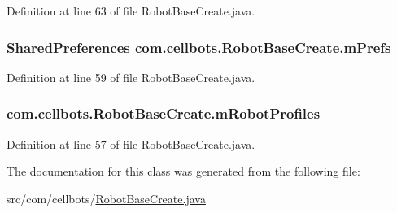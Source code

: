 Definition at line 63 of file Robot\-Base\-Create.\-java.

\hypertarget{classcom_1_1cellbots_1_1_robot_base_create_a67e665a1fb6390ef9611ef49c37d565a}{
\subsubsection[{m\-Prefs}]{\setlength{\rightskip}{0pt plus 5cm}Shared\-Preferences {\bf com.\-cellbots.\-Robot\-Base\-Create.\-m\-Prefs}}}\label{classcom_1_1cellbots_1_1_robot_base_create_a67e665a1fb6390ef9611ef49c37d565a}


Definition at line 59 of file Robot\-Base\-Create.\-java.

\hypertarget{classcom_1_1cellbots_1_1_robot_base_create_a84275e4b962c1fe41e54ebf19f2e57d3}{
\subsubsection[{m\-Robot\-Profiles}]{ {\bf com.\-cellbots.\-Robot\-Base\-Create.\-m\-Robot\-Profiles}}}\label{classcom_1_1cellbots_1_1_robot_base_create_a84275e4b962c1fe41e54ebf19f2e57d3}


Definition at line 57 of file Robot\-Base\-Create.\-java.



The documentation for this class was generated from the following file\-:\begin{DoxyCompactItemize}
\item 
src/com/cellbots/\hyperlink{_robot_base_create_8java}{Robot\-Base\-Create.\-java}\end{DoxyCompactItemize}
